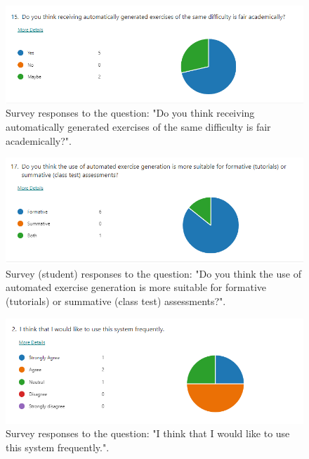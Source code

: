 \documentclass{l4proj}
\begin{document}
\begin{appendices}
\begin{figure}[h]
    \centering
    \includegraphics[width=0.9\linewidth]{images/s_academic_fair.png}    

    \caption{Survey responses to the question: "Do you think receiving automatically generated exercises of the same difficulty is fair academically?".}
    \label{fig:s_academic_fair} 
\end{figure}

\begin{figure}[h]
    \centering
    \includegraphics[width=0.9\linewidth]{images/s_formative_summative.png}    

    \caption{Survey (student) responses to the question: "Do you think the use of automated exercise generation is more suitable for formative (tutorials) or summative (class test) assessments?".}
    \label{fig:s_formative_summative} 
\end{figure}

\begin{figure}[h]
    \centering
    \includegraphics[width=0.9\linewidth]{images/usability1.png}    

    \caption{Survey responses to the question: "I think that I would like to use this system frequently.".}
    \label{fig:usability1} 
\end{figure}


\end{appendices}
\end{document}
